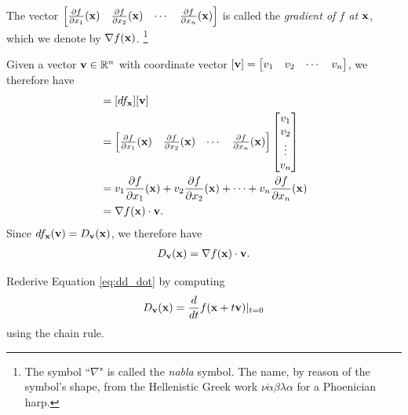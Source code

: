 \documentclass[12pt,letterpaper,reqno]{article}
\numberwithin{equation}{section}
\newcommand{\R}{\ensuremath{\mathbb R}}
\newcommand{\bv}{{\bf v}}
\newcommand{\bx}{{\bf x}}
\begin{document}
{\begin{defn}[Gradient]
	The vector $\begin{bmatrix}
		\frac{\partial f}{\partial x_1}(\bx) & \frac{\partial f}{\partial x_2}(\bx) & \cdots & \frac{\partial f}{\partial x_n}(\bx)
	\end{bmatrix}$ is called the \emph{gradient of $f$ at $\bx$}, which we denote by $\nabla f(\bx)$. \footnote{The symbol ``$\nabla$" is called the \emph{nabla} symbol. The name, by reason of the symbol's shape, from the Hellenistic Greek work $\nu \acute{\alpha} \beta \lambda \alpha$ for a Phoenician harp.}
\end{defn}
Given a vector $\bv \in \R^n$ with coordinate vector $[\bv]=\begin{bmatrix}
	v_1 & v_2 & \cdots & v_n
\end{bmatrix}$, we therefore have
\begin{align*}
	[df_\bx(\bv)]&=[df_\bx][\bv] \\
	&=\begin{bmatrix}
		\frac{\partial f}{\partial x_1}(\bx) & \frac{\partial f}{\partial x_2}(\bx) & \cdots & \frac{\partial f}{\partial x_n}(\bx)
	\end{bmatrix} \begin{bmatrix}
	v_1 \\ v_2 \\ \vdots \\ v_n
\end{bmatrix} \\
&=v_1\frac{\partial f}{\partial x_1}(\bx)+v_2\frac{\partial f}{\partial x_2}(\bx)+\cdots+v_n\frac{\partial f}{\partial x_n}(\bx) \\
&=\nabla f(\bx) \cdot \bv.
\end{align*}
Since $df_\bx(\bv)=D_\bv(\bx)$, we therefore have
\begin{align}\label{eq:dd_dot}
	D_\bv(\bx)=\nabla f(\bx) \cdot \bv.
\end{align}

\begin{exercise}
Rederive Equation \eqref{eq:dd_dot} by computing
\begin{align*}
	D_\bv(\bx)=\frac{d}{dt}f(\bx+t\bv)|_{t=0}
\end{align*}	
using the chain rule.
\end{exercise}

}
\end{document}
